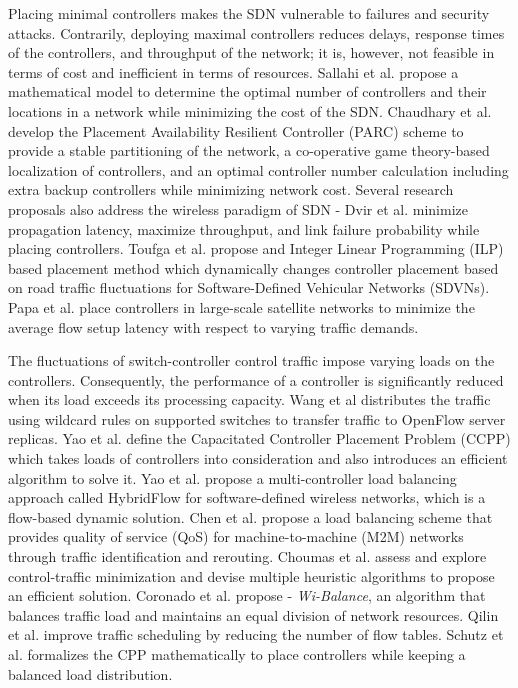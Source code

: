 \documentclass[final,5p,times]{cas-dc}
\begin{document}
	Placing minimal controllers makes the SDN vulnerable to failures and security attacks. Contrarily, deploying maximal controllers reduces delays, response times of the controllers, and throughput of the network; it is, however, not feasible in terms of cost and inefficient in terms of resources. Sallahi et al. \cite{sallahi2015optimal} propose a mathematical model to determine the optimal number of controllers and their locations in a network while minimizing the cost of the SDN. Chaudhary et al. \cite{chaudhary2020cost} develop the Placement Availability Resilient Controller (PARC) scheme to provide a stable partitioning of the network, a co-operative game theory-based localization of controllers, and an optimal controller number calculation including extra backup controllers while minimizing network cost. Several research proposals also address the wireless paradigm of SDN - Dvir et al. \cite{dvir2019wireless} minimize propagation latency, maximize throughput, and link failure probability while placing controllers. Toufga et al. \cite{toufga2020vehicle} propose and Integer Linear Programming (ILP) based placement method which dynamically changes controller placement based on road traffic fluctuations for Software-Defined Vehicular Networks (SDVNs). Papa et al. \cite{papa2020satellite} place controllers in large-scale satellite networks to minimize the average flow setup latency with respect to varying traffic demands.
	
	The fluctuations of switch-controller control traffic impose varying loads on the controllers. Consequently, the performance of a controller is significantly reduced when its load exceeds its processing capacity. Wang et al \cite{wang2011load} distributes the traffic using wildcard rules on supported switches to transfer traffic to OpenFlow \cite{hu2014survey} server replicas. Yao et al. \cite{yao2014capacitated} define the Capacitated Controller Placement Problem (CCPP) which takes loads of controllers into consideration and also introduces an efficient algorithm to solve it. Yao et al. \cite{yao2015controller} propose a multi-controller load balancing approach called HybridFlow for software-defined wireless networks, which is a flow-based dynamic solution. Chen et al. \cite{chen2018load} propose a load balancing scheme that provides quality of service (QoS) for machine-to-machine (M2M) networks through traffic identification and rerouting. Choumas et al. \cite{choumas2020oittraffic} assess and explore control-traffic minimization and devise multiple heuristic algorithms to propose an efficient solution. Coronado et al. \cite{coronado2017wiload} propose - \textit{Wi-Balance}, an algorithm that balances traffic load and maintains an equal division of network resources.
	Qilin et al. \cite{qilin2015load} improve traffic scheduling by reducing the number of flow tables. Schutz et al. \cite{schutz2020load} formalizes the CPP mathematically to place controllers while keeping a balanced load distribution.
	
\end{document}
